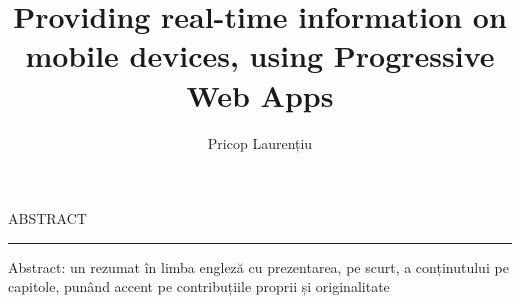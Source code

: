 \documentclass[12pt]{report}
\begin{document}
\title{Providing real-time information on mobile devices, using Progressive Web Apps}
\author{Pricop Laurențiu}

\maketitle

\newpage
\thispagestyle{empty}
\mbox{}
\newpage
{}

\cleardoublepage
ABSTRACT
\vspace{0.5cm}
\hrule
\vspace{0.5cm}

Abstract: un rezumat în limba engleză cu prezentarea, pe scurt, a conținutului pe capitole, punând accent pe contribuțiile proprii și originalitate



\tableofcontents


\newpage
{}









% 

\end{document}
